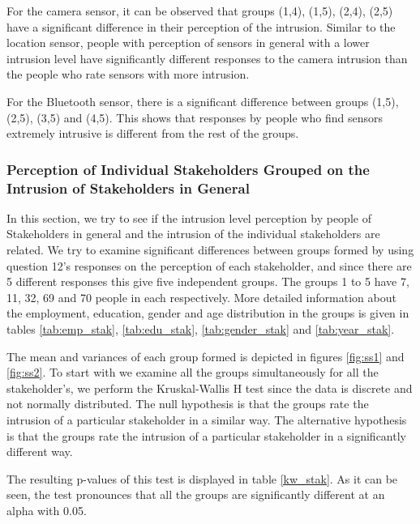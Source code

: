 For the camera sensor, it can be observed that groups (1,4), (1,5), (2,4), (2,5) have a significant difference in their perception of the intrusion.
Similar to the location sensor, people with perception of sensors in general with a lower intrusion level have significantly different responses to the camera intrusion than the people who rate sensors with more intrusion.

For the Bluetooth sensor, there is a significant difference between groups (1,5), (2,5), (3,5) and (4,5). This shows that responses by people who find sensors extremely intrusive is different from the rest of the groups.

\subsubsection{Perception of Individual Stakeholders Grouped on the Intrusion of Stakeholders in General}

In this section, we try to see if the intrusion level perception by people of Stakeholders in general and the intrusion of the individual stakeholders are related. We try to examine significant differences between groups formed by using question 12's responses on the perception of
each stakeholder, and since there are 5 different responses this give five independent groups. The groups 1 to 5 have 7, 11, 32, 69 and 70 people in each respectively. More detailed information about the employment, education, gender and age distribution in the groups is given in tables \ref{tab:emp_stak}, \ref{tab:edu_stak}, \ref{tab:gender_stak} and \ref{tab:year_stak}.

The mean and variances of each group formed is depicted in figures \ref{fig:ss1} and \ref{fig:ss2}.
To start with we examine all the groups simultaneously for all the stakeholder's, we perform the Kruskal-Wallis H test since the data is discrete and not normally distributed. The null hypothesis is that the groups rate the intrusion of a particular stakeholder in a similar way. The alternative hypothesis is that the groups rate the intrusion of a particular stakeholder in a significantly different way.

The resulting p-values of this test is displayed in table \ref{kw_stak}. As it can be seen, the test pronounces that all the groups are significantly different at an alpha with 0.05. 


